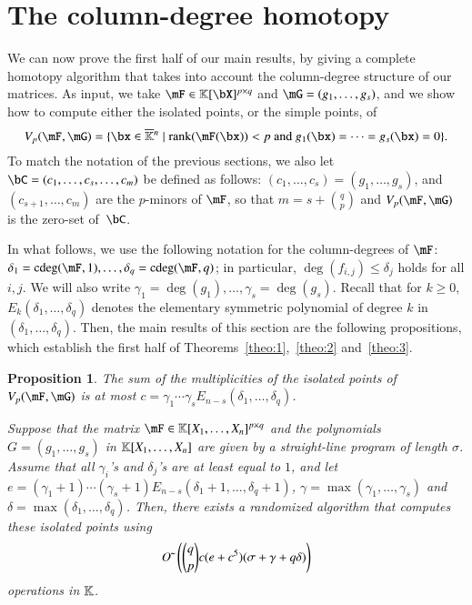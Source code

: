 \documentclass[amsthm]{elsart}
\newtheorem{proposition}[definition]{Proposition}
\begin{document}
\section{The column-degree homotopy}\label{sec:columndegree}

We can now prove the first half of our main results, by giving a
complete homotopy algorithm that takes into account the column-degree
structure of our matrices. As input, we take $\mF \in \K[\bX]^{p\times q}$ and $\mG=(g_1,\dots,g_s)$,
and we show how to compute either the isolated points, or
the simple points, of
$$\VpFG{p}{\mF}{\mG} = \{\bx \in \KKbar{}^n \mid
\mathrm{rank}(\mF({\bx})) < p \text{~and~}
g_1(\bx)=\cdots=g_s(\bx)=0\}.$$ 
To match the notation of the previous sections, we also let
$\bC=(c_1,\dots,c_{s},\dots,c_m)$ be defined as follows:
$(c_1,\dots,c_{s})=(g_1,\dots,g_s)$, and $(c_{s+1},\dots,c_{m})$ are
the $p$-minors of $\mF$, so that $m=s+{q \choose p}$ and
$\VpFG{p}{\mF}{\mG}$ is the zero-set of~$\bC$.


In what follows, we use the following notation for the column-degrees
of $\mF$: $\delta_1=\cdeg(\mF,1),\dots,\delta_q=\cdeg(\mF,q)$; in
particular, $\deg(f_{i,j}) \leq \delta_j$ holds for all $i,j$.  We
will also write $\gamma_1=\deg(g_1),\dots,\gamma_s=\deg(g_s)$.  Recall
that for $k\geq 0$, $E_k(\delta_1,\dots,\delta_q)$ denotes the
elementary symmetric polynomial of degree $k$ in $(\delta_1, \ldots,
\delta_q)$. Then, the main results of this section are the following
propositions, which establish the first half of
Theorems~\ref{theo:1},~\ref{theo:2} and~\ref{theo:3}.

\begin{proposition}\label{prop:coldeg}
  The sum
  of the multiplicities of the isolated points of $\VpFG{p}{\mF}{\mG}$
is at most
  $c=\gamma_1\cdots\gamma_sE_{n-s}(\delta_1, \ldots, \delta_q)$.

  Suppose that the matrix $\mF \in \KK[X_1,\dots,X_n]^{p \times q}$
  and the polynomials $G=(g_1,\dots,g_s)$ in $\mathbb{K}[X_1,\dots,X_n]$ are
  given by a straight-line program of length $\sigma$. 
  Assume that all $\gamma_i$'s and $\delta_j$'s are at least equal to
  $1$, and let
  $e=(\gamma_1+1)\cdots(\gamma_s+1) E_{n-s}(\delta_1+1, \ldots,
  \delta_q+1)$, $\gamma = \max(\gamma_1, \ldots, \gamma_s)$ and
  $\delta = \max(\delta_1, \ldots, \delta_q)$.
  Then, there exists a randomized algorithm that computes these isolated
  points using
  $$
  {O}{\,\tilde{ }\,}\left ({q \choose p} c(e+c^5 )(\sigma +\gamma + q
    \delta)\right)
  $$
  operations in $\mathbb{K}$.
\end{proposition}
\end{document}
